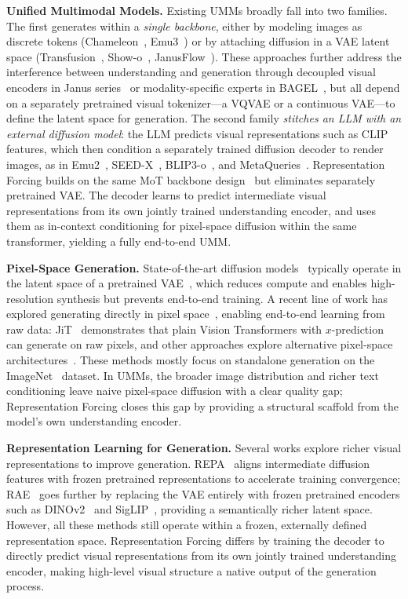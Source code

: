 \documentclass{llmxive}
\begin{document}
\textbf{Unified Multimodal Models.}
Existing UMMs broadly fall into two families. The first generates within a \emph{single backbone}, either by modeling images as discrete tokens (Chameleon~\cite{chameleon}, Emu3~\cite{emu3}) or by attaching diffusion in a VAE latent space (Transfusion~\cite{transfusion}, Show-o~\cite{showo}, JanusFlow~\cite{janusflow}). These approaches further address the interference between understanding and generation through decoupled visual encoders in Janus series~\cite{janus,janus-pro,janusflow} or modality-specific experts in BAGEL~\cite{bagel}, but all depend on a separately pretrained visual tokenizer---a VQVAE or a continuous VAE---to define the latent space for generation. The second family \emph{stitches an LLM with an external diffusion model}: the LLM predicts visual representations such as CLIP features, which then condition a separately trained diffusion decoder to render images, as in Emu2~\cite{emu2}, SEED-X~\cite{seedx}, BLIP3-o~\cite{blip3o}, and MetaQueries~\cite{metaquery}.
Representation Forcing builds on the same MoT backbone design~\cite{bagel} but eliminates separately pretrained VAE. The decoder learns to predict intermediate visual representations from its own jointly trained understanding encoder, and uses them as in-context conditioning for pixel-space diffusion within the same transformer, yielding a fully end-to-end UMM.

\textbf{Pixel-Space Generation.}
State-of-the-art diffusion models~\cite{stable_diff,flux} typically operate in the latent space of a pretrained VAE~\cite{vae}, which reduces compute and enables high-resolution synthesis but prevents end-to-end training. A recent line of work has explored generating directly in pixel space~\cite{DDPM_paper,dhariwal2021diffusion}, enabling end-to-end learning from raw data: JiT~\cite{jit} demonstrates that plain Vision Transformers with $x$-prediction can generate on raw pixels, and other approaches explore alternative pixel-space architectures~\cite{sid2,pixelflow,pixnerd}. These methods mostly focus on standalone generation on the ImageNet~\cite{imagenet} dataset. In UMMs, the broader image distribution and richer text conditioning leave naive pixel-space diffusion with a clear quality gap; Representation Forcing closes this gap by providing a structural scaffold from the model's own understanding encoder.



\textbf{Representation Learning for Generation.}
Several works explore richer visual representations to improve generation. REPA~\cite{repa} aligns intermediate diffusion features with frozen pretrained representations to accelerate training convergence; RAE~\cite{rae,scale-rae-2026} goes further by replacing the VAE entirely with frozen pretrained encoders such as DINOv2~\cite{dinov2} and SigLIP~\cite{siglip}, providing a semantically richer latent space. However, all these methods still operate within a frozen, externally defined representation space. Representation Forcing differs by training the decoder to directly predict visual representations from its own jointly trained understanding encoder, making high-level visual structure a native output of the generation process.
\end{document}
